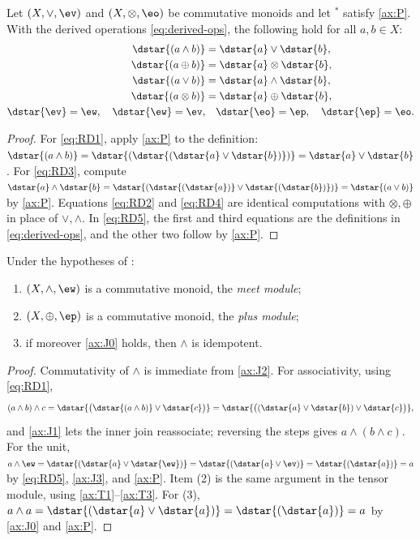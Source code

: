 \begin{proposition}\label{prop:duality}
Let $(X,\vee,\ev)$ and $(X,\otimes,\eo)$ be commutative monoids and let
${}^{*}$ satisfy \eqref{ax:P}. With the derived operations
\eqref{eq:derived-ops}, the following hold for all $a,b \in X$:
\begin{align}
  \dstar{(a \wedge b)} &= \dstar{a} \vee \dstar{b},
    \label{eq:RD1}\\
  \dstar{(a \oplus b)} &= \dstar{a} \otimes \dstar{b},
    \label{eq:RD2}\\
  \dstar{(a \vee b)} &= \dstar{a} \wedge \dstar{b},
    \label{eq:RD3}\\
  \dstar{(a \otimes b)} &= \dstar{a} \oplus \dstar{b},
    \label{eq:RD4}\\
  \dstar{\ev} = \ew,\quad \dstar{\ew} = \ev,&\quad
  \dstar{\eo} = \ep,\quad \dstar{\ep} = \eo.
    \label{eq:RD5}
\end{align}
\end{proposition}

\begin{proof}
For \eqref{eq:RD1}, apply \eqref{ax:P} to the definition:
$\dstar{(a \wedge b)}
 = \dstar{(\dstar{(\dstar{a} \vee \dstar{b})})}
 = \dstar{a} \vee \dstar{b}$.
For \eqref{eq:RD3}, compute
$\dstar{a} \wedge \dstar{b}
 = \dstar{(\dstar{(\dstar{a})} \vee \dstar{(\dstar{b})})}
 = \dstar{(a \vee b)}$ by \eqref{ax:P}. Equations \eqref{eq:RD2} and
\eqref{eq:RD4} are identical computations with $\otimes,\oplus$ in place of
$\vee,\wedge$. In \eqref{eq:RD5}, the first and third equations are the
definitions in \eqref{eq:derived-ops}, and the other two follow by
\eqref{ax:P}.
\end{proof}

\begin{proposition}\label{prop:reflected-modules}
Under the hypotheses of :
\begin{enumerate}
  \item $(X,\wedge,\ew)$ is a commutative monoid, the \emph{meet module};
  \item $(X,\oplus,\ep)$ is a commutative monoid, the \emph{plus module};
  \item if moreover \eqref{ax:J0} holds, then $\wedge$ is idempotent.
\end{enumerate}
\end{proposition}

\begin{proof}
Commutativity of $\wedge$ is immediate from \eqref{ax:J2}. For
associativity, using \eqref{eq:RD1},
\[
  (a \wedge b) \wedge c
  = \dstar{\bigl(\dstar{(a \wedge b)} \vee \dstar{c}\bigr)}
  = \dstar{\bigl((\dstar{a} \vee \dstar{b}) \vee \dstar{c}\bigr)},
\]
and \eqref{ax:J1} lets the inner join reassociate; reversing the steps gives
$a \wedge (b \wedge c)$. For the unit,
$a \wedge \ew
 = \dstar{(\dstar{a} \vee \dstar{\ew})}
 = \dstar{(\dstar{a} \vee \ev)}
 = \dstar{(\dstar{a})} = a$
by \eqref{eq:RD5}, \eqref{ax:J3}, and \eqref{ax:P}. Item (2) is the same
argument in the tensor module, using \eqref{ax:T1}--\eqref{ax:T3}. For (3),
$a \wedge a = \dstar{(\dstar{a} \vee \dstar{a})} = \dstar{(\dstar{a})} = a$
by \eqref{ax:J0} and \eqref{ax:P}.
\end{proof}

